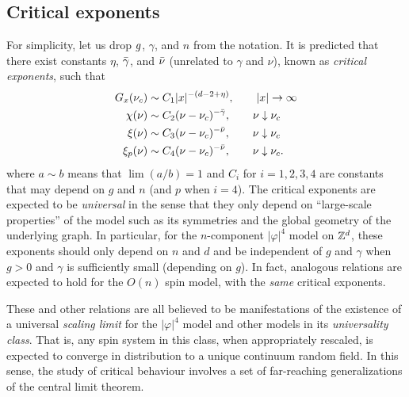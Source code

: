 
\subsection{Critical exponents}

For simplicity, let us drop $g$, $\gamma$, and $n$ from the notation.
It is predicted that there exist constants $\eta$, $\bar\gamma$, and $\bar\nu$
(unrelated to $\gamma$ and $\nu$), known as \emph{critical exponents}, such that
\begin{align}
\label{e:Gpred}
G_x(\nu_c)
	&\sim
C_1 |x|^{-(d - 2 + \eta)},
	\qquad
|x|\rightarrow\infty \\
\chi(\nu)
	&\sim
C_2 (\nu - \nu_c)^{-\bar\gamma},
	\qquad
\nu\downarrow\nu_c \\
\xi(\nu)
	&\sim
C_3 (\nu - \nu_c)^{-\bar\nu},
	\qquad
\nu\downarrow\nu_c \\
\label{e:xippred}
\xi_p(\nu)
	&\sim
C_4 (\nu - \nu_c)^{-\bar\nu},
	\qquad
\nu\downarrow\nu_c.
\end{align}
where $a \sim b$ means that $\lim (a/b) = 1$ and $C_i$ for $i = 1,2,3,4$
are constants that may depend on $g$ and $n$ (and $p$ when $i = 4$).
The critical exponents are expected to be \emph{universal} in the sense that they
only depend on ``large-scale properties'' of the model such as its symmetries and
the global geometry of the underlying graph. In particular,
for the $n$-component $|\varphi|^4$ model on ${ {{\mathbb Z}}^d }$, these exponents should only
depend on $n$ and $d$ and be independent of $g$ and $\gamma$ when $g > 0$ and $\gamma$
is sufficiently small (depending on $g$). In fact,
analogous relations are expected to hold for the $O(n)$ spin model, with the
\emph{same} critical exponents.

These and other relations are all believed to be manifestations of the existence of
a universal \emph{scaling limit} for the $|\varphi|^4$ model and other models in its
\emph{universality class}. That is, any spin system in this class, when appropriately
rescaled, is expected to converge in distribution to a unique continuum random field.
In this sense, the study of critical behaviour involves a set of far-reaching
generalizations of the central limit theorem.

